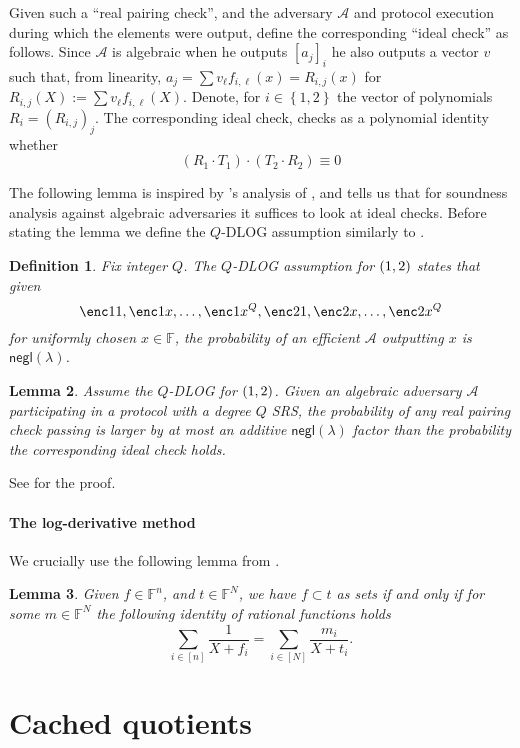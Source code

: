 \documentclass[11pt]{article} %
\newcommand{\F}{\ensuremath{\mathbb F}\xspace}
\newcommand{\adv}{\ensuremath{\mathcal A}\xspace}
\newcommand{\negl}{\ensuremath{\mathsf{negl}(\lambda)}\xspace}
\newcommand{\defeq}{:=}
\newcommand{\enci}[1]{\ensuremath{\left[#1\right]_i}\xspace}
\newcommand{\set}[1]{\ensuremath{\left\{#1\right\}}\xspace}
\newcommand{\sumi}[1]{\sum_{i\in[#1]}}
\newtheorem{lemma}{Lemma}[section]
\newtheorem{dfn}[lemma]{Definition}
\newcommand{\witsize}{\ensuremath{n}\xspace}
\newcommand{\tabsize}{\ensuremath{N}\xspace}
\begin{document}
Given such a ``real pairing check'', and the adversary \adv and protocol execution during which the elements were output, define the corresponding ``ideal check'' as follows.
Since \adv is algebraic when he outputs \enci{a_j} he also outputs a vector $v$ such that, from linearity, $a_j = \sum v_\ell f_{i,\ell}(x)=R_{i,j}(x)$ for $R_{i,j}(X) \defeq \sum v_\ell f_{i,\ell}(X)$.
Denote, for $i\in \set{1,2}$ the vector of polynomials $R_i=(R_{i,j})_j$.
The corresponding ideal check, checks as a polynomial identity whether
\[(R_1 \cdot T_1)\cdot (T_2\cdot R_2) \equiv 0\]


The following lemma is inspired by \cite{AGM}'s analysis of \cite{Groth16},
and tells us that for soundness analysis against algebraic adversaries it suffices to look at ideal checks.
Before stating the lemma we define the $Q$-DLOG assumption similarly to \cite{AGM}.
\begin{dfn}\label{ref:qdlog}
 Fix integer $Q$. The \emph{$Q$-DLOG assumption for $(\G1,\G2)$} states that given 
 \[\enc1{1},\enc1{x},\ldots,\enc1{x^Q},\enc2{1},\enc2{x},\ldots,\enc2{x^Q}\]
 for uniformly chosen $x\in \F$, the probability of an efficient \adv outputting $x$
 is \negl.
\end{dfn}



\begin{lemma}\label{lem:AGManalysis}
Assume the $Q$-DLOG for $(\G1,\G2)$.
 Given an algebraic adversary \adv participating in a protocol with a degree $Q$ SRS,
 the probability of any real pairing check passing is larger by at most an additive \negl factor than the probability the corresponding ideal check holds.
\end{lemma}
See \cite{plonk} for the proof.

\paragraph{The log-derivative method}
We crucially use the following lemma from \cite{mvlookup}.
\begin{lemma}\label{lem:mvlookup}
 Given $f\in \F^\witsize$, and $t\in \F^\tabsize$,
 we have $f\subset t$ as sets if and only if for some $m\in \F^\tabsize$ the following identity of rational functions holds
 \[\sumi{\witsize}\frac{1}{X+f_i}=\sumi{\tabsize}\frac{m_i}{X+t_i}.\]
\end{lemma}

\section{Cached quotients}
\end{document}
